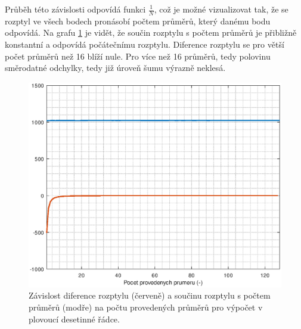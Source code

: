 Průběh této závislosti odpovídá funkci $\frac{1}{N}$, což je možné vizualizovat tak, že se rozptyl ve všech bodech pronásobí počtem průměrů, který danému bodu odpovídá. Na grafu \ref{averaging_float_difference_error} je vidět, že součin rozptylu s počtem průměrů je přibližně konstantní a odpovídá počátečnímu rozptylu. Diference rozptylu se pro větší počet průměrů než 16 blíží nule. Pro více než 16 průměrů, tedy polovinu směrodatné odchylky, tedy již úroveň šumu výrazně neklesá.

\begin{figure}[htbp]
\includegraphics[width=\textwidth,keepaspectratio]{images/averaging_float_difference_error.eps}\caption{Závislost diference rozptylu (červeně) a součinu rozptylu s počtem průměrů (modře) na počtu provedených průměrů pro výpočet v plovoucí desetinné řádce.}\label{averaging_float_difference_error}
\end{figure}

